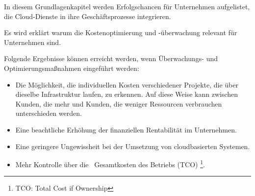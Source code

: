 In diesem Grundlagenkapitel werden Erfolgschancen für Unternehmen aufgelistet, die Cloud-Dienste in ihre Geschäftsprozesse integrieren.
\\
\begin{flushleft}
      Es wird erklärt warum die Kostenoptimierung und -überwachung relevant für Unternehmen sind.
\end{flushleft}
Folgende Ergebnisse können erreicht werden, wenn Überwachungs- und Optimierungsmaßnahmen eingeführt werden:
\begin{itemize}
      \item
            Die Möglichkeit, die individuellen Kosten verschiedener Projekte, die über dieselbe Infrastruktur laufen, zu erkennen. 
            Auf diese Weise kann zwischen Kunden, die mehr und Kunden, die weniger Ressourcen verbrauchen unterschieden werden.
      \item
            Eine beachtliche Erhöhung der finanziellen Rentabilität im Unternehmen.
      \item
            Eine geringere Ungewissheit bei der Umsetzung von cloudbasierten Systemen.
      \item
            Mehr Kontrolle über die  Gesamtkosten des Betriebs (TCO)
            \footnote{TCO: Total Cost if Ownership}.
            
\end{itemize}




